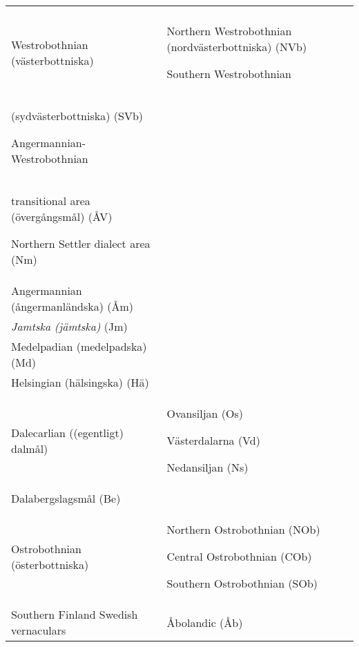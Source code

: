 \begin{tabular}{ll}
\lsptoprule
\multicolumn{2}{l}{Norrbothnian (norrbottniska)

}\\
Westrobothnian (västerbottniska) & 
Northern Westrobothnian (nordvästerbottniska) (NVb)

Southern Westrobothnian\\
(sydvästerbottniska) (SVb)

Angermannian-Westrobothnian\\
transitional area (övergångsmål) (ÅV)

Northern Settler dialect area (Nm) & \\
Angermannian (ångermanländska) (Åm) & \\
\textit{Jamtska (jämtska)} (Jm) & \\
Medelpadian (medelpadska) (Md) & \\
Helsingian (hälsingska) (Hä) & \\
Dalecarlian ((egentligt) dalmål) & 
Ovansiljan (Os)

Västerdalarna (Vd)

Nedansiljan (Ns)

\\
Dalabergslagsmål (Be) & \\
Ostrobothnian (österbottniska) & 
Northern Ostrobothnian (NOb)

Central Ostrobothnian (COb)

Southern Ostrobothnian (SOb)

\\
Southern Finland Swedish vernaculars &
Åbolandic (Åb)


\end{tabular}
